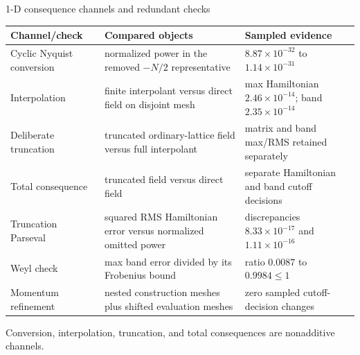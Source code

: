 \documentclass[aspectratio=169,10pt]{beamer}
\begin{document}
\begin{frame}{1-D consequence channels and redundant checks}
  \scriptsize
  \begin{tabular}{p{}p{}p{}}
    \toprule
    Channel/check & Compared objects & Sampled evidence\\
    \midrule
    Cyclic Nyquist conversion
      & normalized power in the removed $-N/2$ representative
      & $8.87\times10^{-32}$ to $1.14\times10^{-31}$\\[0.45em]
    Interpolation
      & finite interpolant versus direct field on disjoint mesh
      & max Hamiltonian $2.46\times10^{-14}$; band $2.35\times10^{-14}$\\[0.45em]
    Deliberate truncation
      & truncated ordinary-lattice field versus full interpolant
      & matrix and band max/RMS retained separately\\[0.45em]
    Total consequence
      & truncated field versus direct field
      & separate Hamiltonian and band cutoff decisions\\[0.45em]
    Truncation Parseval
      & squared RMS Hamiltonian error versus normalized omitted power
      & discrepancies $8.33\times10^{-17}$ and $1.11\times10^{-16}$\\[0.45em]
    Weyl check
      & max band error divided by its Frobenius bound
      & ratio $0.0087$ to $0.9984\le1$\\[0.45em]
    Momentum refinement
      & nested construction meshes plus shifted evaluation meshes
      & zero sampled cutoff-decision changes\\
    \bottomrule
  \end{tabular}

  \centering
  Conversion, interpolation, truncation, and total consequences are nonadditive channels.
\end{frame}
\end{document}
